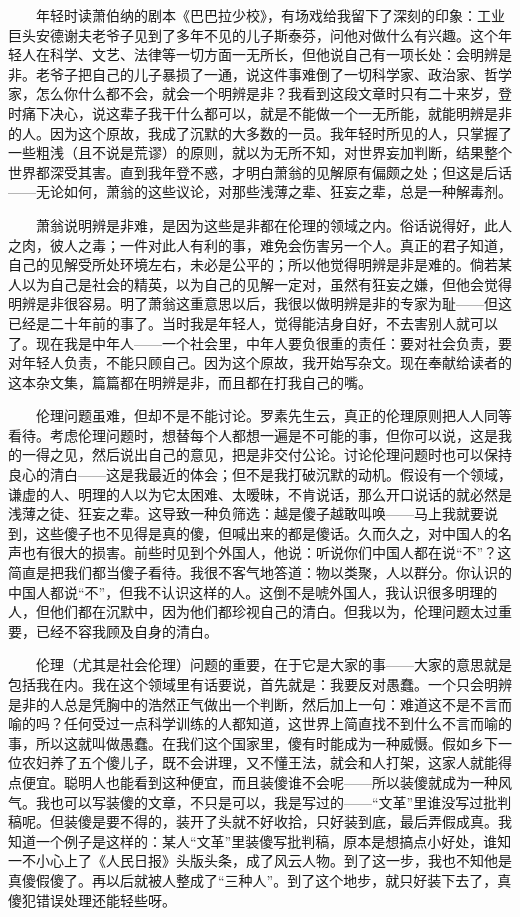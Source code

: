 　　年轻时读萧伯纳的剧本《巴巴拉少校》，有场戏给我留下了深刻的印象：工业巨头安德谢夫老爷子见到了多年不见的儿子斯泰芬，问他对做什么有兴趣。这个年轻人在科学、文艺、法律等一切方面一无所长，但他说自己有一项长处：会明辨是非。老爷子把自己的儿子暴损了一通，说这件事难倒了一切科学家、政治家、哲学家，怎么你什么都不会，就会一个明辨是非？我看到这段文章时只有二十来岁，登时痛下决心，说这辈子我干什么都可以，就是不能做一个一无所能，就能明辨是非的人。因为这个原故，我成了沉默的大多数的一员。我年轻时所见的人，只掌握了一些粗浅（且不说是荒谬）的原则，就以为无所不知，对世界妄加判断，结果整个世界都深受其害。直到我年登不惑，才明白萧翁的见解原有偏颇之处；但这是后话——无论如何，萧翁的这些议论，对那些浅薄之辈、狂妄之辈，总是一种解毒剂。 

　　萧翁说明辨是非难，是因为这些是非都在伦理的领域之内。俗话说得好，此人之肉，彼人之毒；一件对此人有利的事，难免会伤害另一个人。真正的君子知道，自己的见解受所处环境左右，未必是公平的；所以他觉得明辨是非是难的。倘若某人以为自己是社会的精英，以为自己的见解一定对，虽然有狂妄之嫌，但他会觉得明辨是非很容易。明了萧翁这重意思以后，我很以做明辨是非的专家为耻——但这已经是二十年前的事了。当时我是年轻人，觉得能洁身自好，不去害别人就可以了。现在我是中年人——一个社会里，中年人要负很重的责任：要对社会负责，要对年轻人负责，不能只顾自己。因为这个原故，我开始写杂文。现在奉献给读者的这本杂文集，篇篇都在明辨是非，而且都在打我自己的嘴。 

　　伦理问题虽难，但却不是不能讨论。罗素先生云，真正的伦理原则把人人同等看待。考虑伦理问题时，想替每个人都想一遍是不可能的事，但你可以说，这是我的一得之见，然后说出自己的意见，把是非交付公论。讨论伦理问题时也可以保持良心的清白——这是我最近的体会；但不是我打破沉默的动机。假设有一个领域，谦虚的人、明理的人以为它太困难、太暧昧，不肯说话，那么开口说话的就必然是浅薄之徒、狂妄之辈。这导致一种负筛选：越是傻子越敢叫唤——马上我就要说到，这些傻子也不见得是真的傻，但喊出来的都是傻话。久而久之，对中国人的名声也有很大的损害。前些时见到个外国人，他说：听说你们中国人都在说“不”？这简直是把我们都当傻子看待。我很不客气地答道：物以类聚，人以群分。你认识的中国人都说“不”，但我不认识这样的人。这倒不是唬外国人，我认识很多明理的人，但他们都在沉默中，因为他们都珍视自己的清白。但我以为，伦理问题太过重要，已经不容我顾及自身的清白。 

　　伦理（尤其是社会伦理）问题的重要，在于它是大家的事——大家的意思就是包括我在内。我在这个领域里有话要说，首先就是：我要反对愚蠢。一个只会明辨是非的人总是凭胸中的浩然正气做出一个判断，然后加上一句：难道这不是不言而喻的吗？任何受过一点科学训练的人都知道，这世界上简直找不到什么不言而喻的事，所以这就叫做愚蠢。在我们这个国家里，傻有时能成为一种威慑。假如乡下一位农妇养了五个傻儿子，既不会讲理，又不懂王法，就会和人打架，这家人就能得点便宜。聪明人也能看到这种便宜，而且装傻谁不会呢——所以装傻就成为一种风气。我也可以写装傻的文章，不只是可以，我是写过的——“文革”里谁没写过批判稿呢。但装傻是要不得的，装开了头就不好收拾，只好装到底，最后弄假成真。我知道一个例子是这样的：某人“文革”里装傻写批判稿，原本是想搞点小好处，谁知一不小心上了《人民日报》头版头条，成了风云人物。到了这一步，我也不知他是真傻假傻了。再以后就被人整成了“三种人”。到了这个地步，就只好装下去了，真傻犯错误处理还能轻些呀。 

